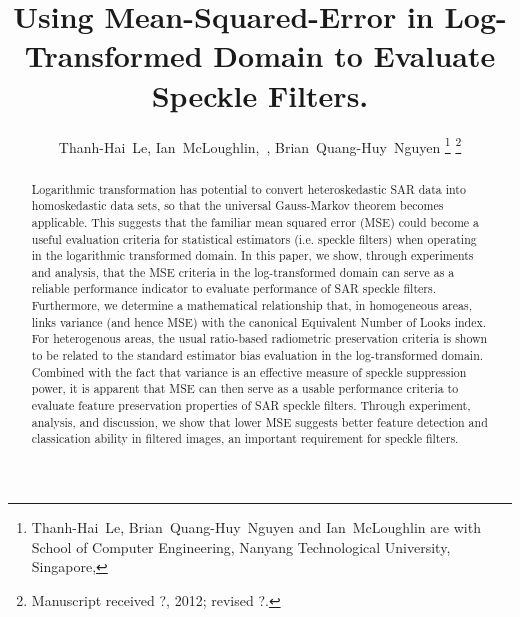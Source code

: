 \documentclass[journal]{IEEEtran}
\title{ 
	Using Mean-Squared-Error in Log-Transformed Domain to Evaluate Speckle Filters.
}
\author{Thanh-Hai~Le,
        Ian~McLoughlin,~\IEEEmembership{Senior Member,~IEEE}, 
	Brian~Quang-Huy~Nguyen %
\thanks{Thanh-Hai~Le, Brian~Quang-Huy~Nguyen and Ian~McLoughlin are with School of Computer Engineering, 
Nanyang Technological University, Singapore,}%
\thanks{Manuscript received ?, 2012; revised ?.}}
\begin{document}
\maketitle

\begin{abstract}

Logarithmic transformation has potential to convert heteroskedastic SAR data into homoskedastic data sets, so that the universal Gauss-Markov theorem becomes applicable. This suggests that the familiar mean squared error (MSE) could become a useful evaluation criteria for statistical estimators (i.e. speckle filters) when operating in the logarithmic transformed domain.
In this paper, we show, through experiments and analysis, that the MSE criteria in the log-transformed domain can serve as a reliable performance indicator to evaluate performance of SAR speckle filters. Furthermore, we determine a mathematical relationship that, in homogeneous areas, links variance (and hence MSE) with the canonical Equivalent Number of Looks index.
For heterogenous areas, the usual ratio-based radiometric preservation criteria is shown to be related to the standard estimator bias evaluation in the log-transformed domain. 
Combined with the fact that variance is an effective measure of speckle suppression power, it is apparent that MSE can then serve as a usable performance criteria to evaluate feature preservation properties of SAR speckle filters.
Through experiment, analysis, and discussion, we show that lower MSE suggests better feature detection and classication ability in filtered images, an important requirement for speckle filters.

\end{abstract}
\end{document}
